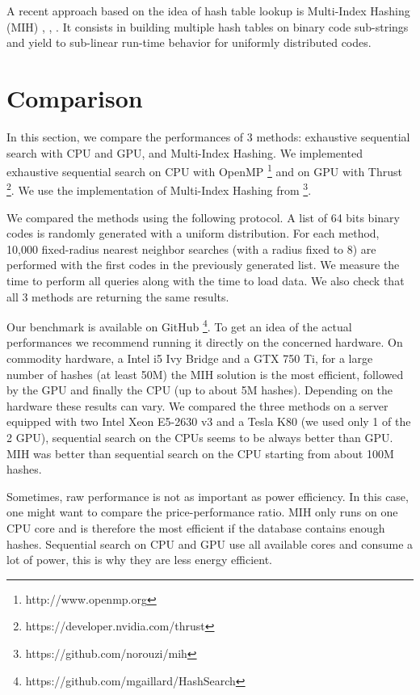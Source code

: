 A recent approach based on the idea of hash table lookup is Multi-Index Hashing (MIH) \cite{norouzi2012fast}, \cite{norouzi2016}, \cite{gog2016fast}. It consists in building multiple hash tables on binary code sub-strings and yield to sub-linear run-time behavior for uniformly distributed codes.

\section{Comparison}
In this section, we compare the performances of 3 methods: exhaustive sequential search with CPU and GPU, and Multi-Index Hashing. We implemented exhaustive sequential search on CPU with OpenMP \footnote{http://www.openmp.org} and on GPU with Thrust \footnote{https://developer.nvidia.com/thrust}. We use the implementation of Multi-Index Hashing from \cite{norouzi2012fast} \footnote{https://github.com/norouzi/mih}.

We compared the methods using the following protocol. A list of 64 bits binary codes is randomly generated with a uniform distribution. For each method, 10,000 fixed-radius nearest neighbor searches (with a radius fixed to 8) are performed with the first codes in the previously generated list. We measure the time to perform all queries along with the time to load data. We also check that all 3 methods are returning the same results.

Our benchmark is available on GitHub \footnote{https://github.com/mgaillard/HashSearch}. To get an idea of the actual performances we recommend running it directly on the concerned hardware. On commodity hardware, a Intel i5 Ivy Bridge and a GTX 750 Ti, for a large number of hashes (at least 50M) the MIH solution is the most efficient, followed by the GPU and finally the CPU (up to about 5M hashes). Depending on the hardware these results can vary. We compared the three methods on a server equipped with two Intel Xeon E5-2630 v3 and a Tesla K80 (we used only 1 of the 2 GPU), sequential search on the CPUs seems to be always better than GPU. MIH was better than sequential search on the CPU starting from about 100M hashes.

Sometimes, raw performance is not as important as power efficiency. In this case, one might want to compare the price-performance ratio. MIH only runs on one CPU core and is therefore the most efficient if the database contains enough hashes. Sequential search on CPU and GPU use all available cores and consume a lot of power, this is why they are less energy efficient.
